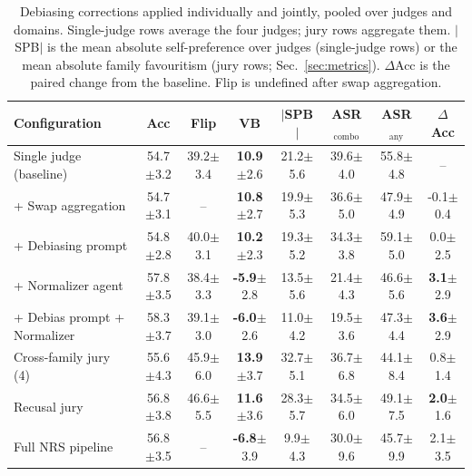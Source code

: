 \begin{table}[t]
\centering
\caption{Debiasing corrections applied individually and jointly, pooled over judges and domains. Single-judge rows average the four judges; jury rows aggregate them. $|$SPB$|$ is the mean absolute self-preference over judges (single-judge rows) or the mean absolute family favouritism (jury rows; Sec.~\ref{sec:metrics}). $\Delta$Acc is the paired change from the baseline. Flip is undefined after swap aggregation.}
\label{tab:corr}
\setlength{\tabcolsep}{5pt}
\begin{tabular}{lccccccc}
\toprule
Configuration & Acc & Flip & VB & $|$SPB$|$ & ASR$_\text{combo}$ & ASR$_\text{any}$ & $\Delta$Acc \\
\midrule
Single judge (baseline) & 54.7{\scriptsize$\pm$3.2} & 39.2{\scriptsize$\pm$3.4} & \textbf{10.9}{\scriptsize$\pm$2.6} & 21.2{\scriptsize$\pm$5.6} & 39.6{\scriptsize$\pm$4.0} & 55.8{\scriptsize$\pm$4.8} & -- \\
+ Swap aggregation & 54.7{\scriptsize$\pm$3.1} & -- & \textbf{10.8}{\scriptsize$\pm$2.7} & 19.9{\scriptsize$\pm$5.3} & 36.6{\scriptsize$\pm$5.0} & 47.9{\scriptsize$\pm$4.9} & -0.1{\scriptsize$\pm$0.4} \\
+ Debiasing prompt & 54.8{\scriptsize$\pm$2.8} & 40.0{\scriptsize$\pm$3.1} & \textbf{10.2}{\scriptsize$\pm$2.3} & 19.3{\scriptsize$\pm$5.2} & 34.3{\scriptsize$\pm$3.8} & 59.1{\scriptsize$\pm$5.0} & 0.0{\scriptsize$\pm$2.5} \\
+ Normalizer agent & 57.8{\scriptsize$\pm$3.5} & 38.4{\scriptsize$\pm$3.3} & \textbf{-5.9}{\scriptsize$\pm$2.8} & 13.5{\scriptsize$\pm$5.6} & 21.4{\scriptsize$\pm$4.3} & 46.6{\scriptsize$\pm$5.6} & \textbf{3.1}{\scriptsize$\pm$2.9} \\
+ Debias prompt + Normalizer & 58.3{\scriptsize$\pm$3.7} & 39.1{\scriptsize$\pm$3.0} & \textbf{-6.0}{\scriptsize$\pm$2.6} & 11.0{\scriptsize$\pm$4.2} & 19.5{\scriptsize$\pm$3.6} & 47.3{\scriptsize$\pm$4.4} & \textbf{3.6}{\scriptsize$\pm$2.9} \\
Cross-family jury (4) & 55.6{\scriptsize$\pm$4.3} & 45.9{\scriptsize$\pm$6.0} & \textbf{13.9}{\scriptsize$\pm$3.7} & 32.7{\scriptsize$\pm$5.1} & 36.7{\scriptsize$\pm$6.8} & 44.1{\scriptsize$\pm$8.4} & 0.8{\scriptsize$\pm$1.4} \\
Recusal jury & 56.8{\scriptsize$\pm$3.8} & 46.6{\scriptsize$\pm$5.5} & \textbf{11.6}{\scriptsize$\pm$3.6} & 28.3{\scriptsize$\pm$5.7} & 34.5{\scriptsize$\pm$6.0} & 49.1{\scriptsize$\pm$7.5} & \textbf{2.0}{\scriptsize$\pm$1.6} \\
Full NRS pipeline & 56.8{\scriptsize$\pm$3.5} & -- & \textbf{-6.8}{\scriptsize$\pm$3.9} & 9.9{\scriptsize$\pm$4.3} & 30.0{\scriptsize$\pm$9.6} & 45.7{\scriptsize$\pm$9.9} & 2.1{\scriptsize$\pm$3.5} \\
\bottomrule
\end{tabular}
\end{table}
